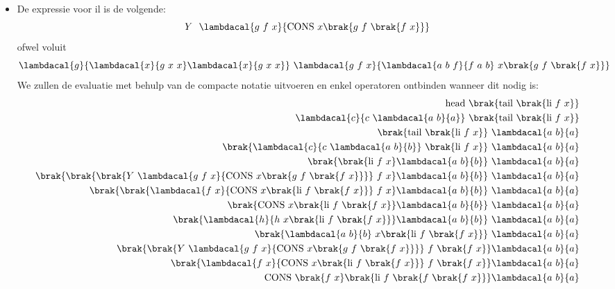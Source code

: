 \documentclass[fleqn]{article}
\newcommand{\cons}{\mbox{CONS}}
\begin{document}
\begin{answer}\hfill
\begin{itemize}
 \item De expressie voor $\mbox{il}$ is de volgende:
\begin{equation}
Y\ \ \lambdacal{g\ f\ x}{\cons\ x \brak{g\ f\ \brak{f\ x}}}
\end{equation} ofwel voluit
\begin{equation}
\lambdacal{g}{\lambdacal{x}{g\ x\ x}\lambdacal{x}{g\ x\ x}}\ \lambdacal{g\ f\ x}{\lambdacal{a\ b\ f}{f\ a\ b}\ x \brak{g\ f\ \brak{f\ x}}}
\end{equation}
We zullen de evaluatie met behulp van de compacte notatie uitvoeren en enkel operatoren ontbinden wanneer dit nodig is:
\begin{eqnarray}
\mbox{head}\ \brak{\mbox{tail}\ \brak{\mbox{li}\ f\ x}}\hfill\\
\lambdacal{c}{c\ \lambdacal{a\ b}{a}}\ \brak{\mbox{tail}\ \brak{ \mbox{li}\ f\ x }}\hfill\\
\brak{\mbox{tail}\ \brak{ \mbox{li}\ f\ x }}\ \lambdacal{a\ b}{a}\hfill\\
\brak{\lambdacal{c}{c\ \lambdacal{a\ b}{b}}\ \brak{ \mbox{li}\ f\ x }}\ \lambdacal{a\ b}{a}\hfill\\
\brak{\brak{ \mbox{li}\ f\ x } \lambdacal{a\ b}{b}}\ \lambdacal{a\ b}{a}\hfill\\
\brak{\brak{ \brak{ Y\ \lambdacal{g\ f\ x}{\cons\ x \brak{g\ f\ \brak{f\ x}}} }\ f\ x } \lambdacal{a\ b}{b}}\ \lambdacal{a\ b}{a}\hfill\\
\brak{\brak{ \lambdacal{f\ x}{\cons\ x \brak{\mbox{li}\ f\ \brak{f\ x}}}\ f\ x } \lambdacal{a\ b}{b}}\ \lambdacal{a\ b}{a}\hfill\\
\brak{\cons\ x \brak{\mbox{li}\ f\ \brak{f\ x}} \lambdacal{a\ b}{b}}\ \lambdacal{a\ b}{a}\hfill\\
\brak{\lambdacal{h}{h\ x \brak{\mbox{li}\ f\ \brak{f\ x}}} \lambdacal{a\ b}{b}}\ \lambdacal{a\ b}{a}\hfill\\
\brak{\lambdacal{a\ b}{b}\ x \brak{\mbox{li}\ f\ \brak{f\ x}} }\ \lambdacal{a\ b}{a}\hfill\\
\brak{\brak{ Y\ \lambdacal{g\ f\ x}{\cons\ x \brak{g\ f\ \brak{f\ x}}} }\ f\ \brak{f\ x} }\lambdacal{a\ b}{a}\hfill\\
\brak{\lambdacal{f\ x}{\cons\ x \brak{\mbox{li}\ f\ \brak{f\ x}}}\ f\ \brak{f\ x} }\lambdacal{a\ b}{a}\hfill\\
\cons\ \brak{f\ x} \brak{\mbox{li}\ f\ \brak{f\ \brak{f\ x}}}\lambdacal{a\ b}{a}\hfill\\

\end{eqnarray}
\end{itemize}
\end{answer}
\end{document}
